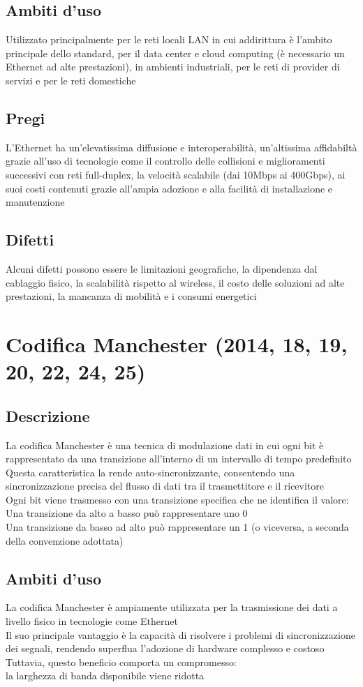 \documentclass[10pt,oneside,a4paper]{article}
\begin{document}
\subsection{Ambiti d'uso}
Utilizzato principalmente per le reti locali LAN in cui addirittura è l'ambito principale dello standard, per il data center e cloud computing (è necessario un Ethernet ad alte prestazioni), in ambienti industriali, per le reti di provider di servizi e per le reti domestiche
\subsection{Pregi}
L'Ethernet ha un'elevatissima diffusione e interoperabilità, un'altissima affidabiltà grazie all'uso di tecnologie come il controllo delle collisioni e miglioramenti successivi con reti full-duplex, la velocità scalabile (dai 10Mbps ai 400Gbps), ai suoi costi contenuti grazie all'ampia adozione e alla facilità di installazione e manutenzione
\subsection{Difetti}
Alcuni difetti possono essere le limitazioni geografiche, la dipendenza dal cablaggio fisico, la scalabilità rispetto al wireless, il costo delle soluzioni ad alte prestazioni, la mancanza di mobilità e i consumi energetici
\section{Codifica Manchester (2014, 18, 19, 20, 22, 24, 25)}
\subsection{Descrizione} La codifica Manchester è una tecnica di modulazione dati in cui ogni bit è rappresentato da una transizione all'interno di un intervallo di tempo predefinito\\
Questa caratteristica la rende auto-sincronizzante, consentendo una sincronizzazione precisa del flusso di dati tra il trasmettitore e il ricevitore\\
Ogni bit viene trasmesso con una transizione specifica che ne identifica il valore:\\
Una transizione da alto a basso può rappresentare uno 0\\
Una transizione da basso ad alto può rappresentare un 1 (o viceversa, a seconda della convenzione adottata)
\subsection{Ambiti d'uso}
La codifica Manchester è ampiamente utilizzata per la trasmissione dei dati a livello fisico in tecnologie come Ethernet\\
Il suo principale vantaggio è la capacità di risolvere i problemi di sincronizzazione dei segnali, rendendo superflua l’adozione di hardware complesso e costoso\\
Tuttavia, questo beneficio comporta un compromesso:\\
la larghezza di banda disponibile viene ridotta
\end{document}
